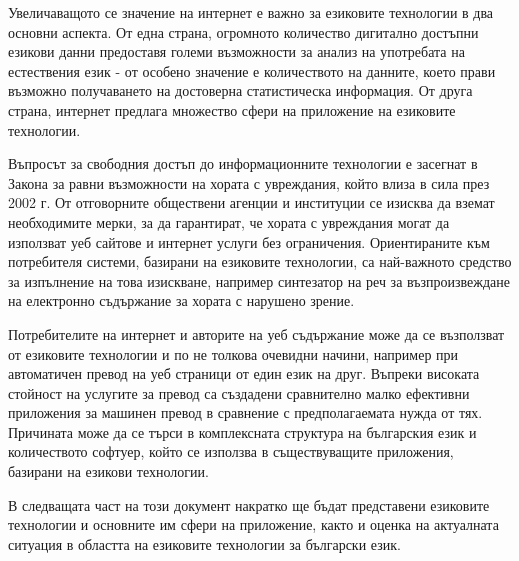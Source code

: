 \begin{multicols}{2}

  Увеличаващото се значение на интернет е важно за езиковите технологии в два основни аспекта. От една страна, огромното количество дигитално достъпни езикови данни предоставя големи възможности за анализ на употребата на естествения език - от особено значение е количеството на данните, което прави възможно получаването на достоверна статистическа информация. От друга страна, интернет предлага множество сфери на приложение на езиковите технологии. 

  Въпросът за свободния достъп до информационните технологии е засегнат в Закона за равни възможности на хората с увреждания, който влиза в сила през 2002 г. От отговорните обществени агенции и институции се изисква да вземат необходимите мерки, за да гарантират, че хората с увреждания могат да използват уеб сайтове и интернет услуги без ограничения. Ориентираните към потребителя системи, базирани на езиковите технологии, са най-важното средство за изпълнение на това изискване, например синтезатор на реч за възпроизвеждане  на електронно съдържание за хората с нарушено зрение.

  Потребителите на интернет и авторите на уеб съдържание може да се възползват от езиковите технологии и по не толкова очевидни начини, например при автоматичен превод на уеб страници от един език на друг. Въпреки високата стойност на услугите за превод са създадени сравнително малко ефективни приложения за машинен превод в сравнение с предполагаемата нужда от тях. Причината може да се търси в комплексната структура на българския език и количеството софтуер, който се използва в съществуващите приложения, базирани на езикови технологии. 

  В следващата част на този документ накратко ще бъдат представени езиковите технологии и основните им сфери на приложение, както и оценка на актуалната ситуация в областта на езиковите технологии за български език. 
  \end{multicols}

  \clearpage



